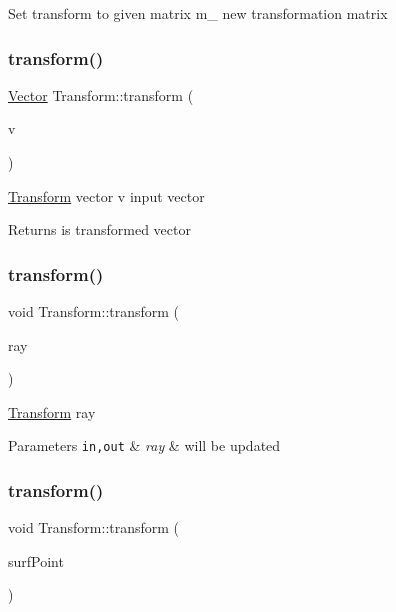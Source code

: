Set transform to given matrix  m\+\_\+ new transformation matrix \mbox{\label{class_transform_a0326d611d8d74b4a43f0b6aaf1b87d67}} 
\subsubsection{\texorpdfstring{transform()}{transform()}\hspace{0.1cm}{\footnotesize\ttfamily [1/3]}}
{\footnotesize\ttfamily \mbox{\hyperlink{struct_vector}{Vector}} Transform\+::transform (\begin{DoxyParamCaption}\item[{\mbox{\hyperlink{struct_vector}{Vector}}}]{v }\end{DoxyParamCaption})}

\mbox{\hyperlink{class_transform}{Transform}} vector  v input vector \begin{DoxyReturn}{Returns}
is transformed vector 
\end{DoxyReturn}
\mbox{\label{class_transform_a9e08226abcc24477177fe1eeafaa43df}} 
\subsubsection{\texorpdfstring{transform()}{transform()}\hspace{0.1cm}{\footnotesize\ttfamily [2/3]}}
{\footnotesize\ttfamily void Transform\+::transform (\begin{DoxyParamCaption}\item[{\mbox{\hyperlink{class_ray}{Ray}} \&}]{ray }\end{DoxyParamCaption})}

\mbox{\hyperlink{class_transform}{Transform}} ray 
\begin{DoxyParams}[1]{Parameters}
\mbox{\tt in,out}  & {\em ray} & will be updated \\
\hline
\end{DoxyParams}
\mbox{\label{class_transform_afd54e58d092b30f7613f86c68a43ea9a}} 
\subsubsection{\texorpdfstring{transform()}{transform()}\hspace{0.1cm}{\footnotesize\ttfamily [3/3]}}
{\footnotesize\ttfamily void Transform\+::transform (\begin{DoxyParamCaption}\item[{\mbox{\hyperlink{class_surface_point}{Surface\+Point}} \&}]{surf\+Point }\end{DoxyParamCaption})}

